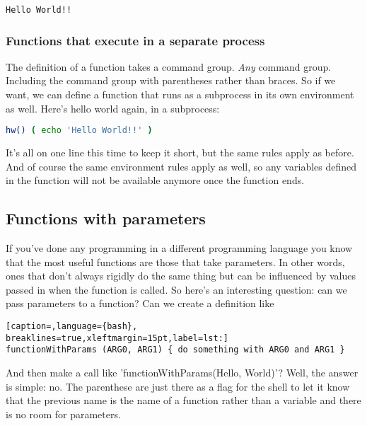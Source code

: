 \scriptsize
\begin{verbatim}
Hello World!!
\end{verbatim}
\normalsize

\subsubsection{Functions that execute in a separate process}
The definition of a function takes a command group. \emph{Any} command group.
Including the command group with parentheses rather than braces. So if we want,
we can define a function that runs as a subprocess in its own environment as
well. Here's hello world again, in a subprocess:

\lstset{basicstyle=\scriptsize, numbers=left, captionpos=b, tabsize=4}
\begin{lstlisting}[caption=Hello world as a named function,language={bash},
breaklines=true,xleftmargin=15pt,label=lst:Hello world as a named function]
hw() ( echo 'Hello World!!' )
\end{lstlisting}

It's all on one line this time to keep it short, but the same rules apply as
before. And of course the same environment rules apply as well, so any
variables defined in the function will not be available anymore once the
function ends.

\subsection{Functions with parameters}
If you've done any programming in a different programming language you know
that the most useful functions are those that take parameters. In other words,
ones that don't always rigidly do the same thing but can be influenced by
values passed in when the function is called. So here's an interesting
question: can we pass parameters to a function? Can we create a definition like
\lstset{basicstyle=\scriptsize, numbers=left, captionpos=b, tabsize=4}
\begin{lstlisting}[caption=,language={bash},
breaklines=true,xleftmargin=15pt,label=lst:]
functionWithParams (ARG0, ARG1) { do something with ARG0 and ARG1 } 
\end{lstlisting}

And then make a call like 'functionWithParams(Hello, World)'? Well, the answer
is simple: no. The parenthese are just there as a flag for the shell to let it
know that the previous name is the name of a function rather than a variable
and there is no room for parameters.


